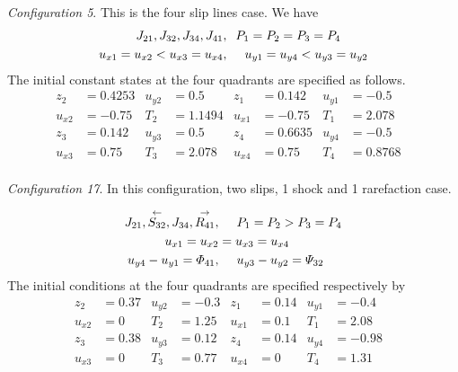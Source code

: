 \documentclass{rsproca}%
\begin{document}
{\em Configuration 5}.
This is the four slip lines case.  We have
\begin{align*}
{J_{21}},J_{32},J_{34},{J_{41}},&\hspace{0.1in}P_1=P_2=P_3=P_4\\
u_{x1}=u_{x2}<u_{x3}=u_{x4},&\hspace{0.2in}u_{y1}=u_{y4}<u_{y3}=u_{y2}
\end{align*}
The initial constant states at the four quadrants are specified as follows.
\begin{align*}
z_2	&=0.4253& 	u_{y2}&=0.5& 	z_1&=0.142& 		u_{y1}&=-0.5& \\
u_{x2}&=-0.75&	T_2&=1.1494& 	u_{x1}&=-0.75& 	T_1&=2.078&		\\
z_3&=0.142&			u_{y3}&=0.5& 	z_4&=0.6635& 		u_{y4}&=-0.5&	\\
u_{x3}&=0.75&		T_3&=2.078& 	u_{x4}&=0.75& 	T_4&=0.8768&	\\
\end{align*}

{\em Configuration 17}.
In this configuration, two slips, 1 shock and 1 rarefaction case.

\begin{align*}
J_{21},\stackrel{\leftarrow}{S_{32}},J_{34},\stackrel{\rightarrow}{R_{41}},&\hspace{0.2in}P_1=P_2>P_3=P_4  \\
u_{x1}=u_{x2}&=u_{x3}=u_{x4}\\
u_{y4}-u_{y1}=\Phi_{41},&\hspace{0.2in}u_{y3}-u_{y2}=\Psi_{32}
\end{align*}
The initial conditions at the four quadrants are specified respectively by
\begin{align*}
z_2		&=0.37& u_{y2}	&=-0.3& z_1		 	&=0.14& 	u_{y1}	&=-0.4& 	\\
u_{x2}&=0& 		T_2			&=1.25& u_{x1}	&=0.1& 		T_1			&=2.08&		\\
z_3		&=0.38& u_{y3}	&=0.12& z_4			&=0.14&		u_{y4}	&=-0.98& 	\\
u_{x3}&=0& 		T_3			&=0.77& u_{x4}	&=0& 			T_4			&=1.31&		\\
\end{align*}
\end{document}
